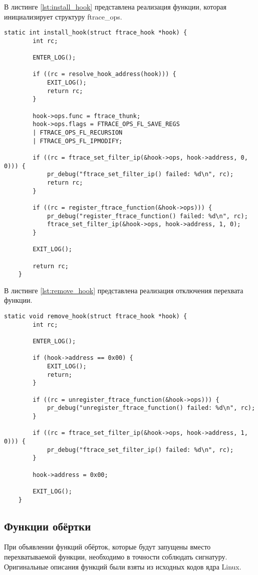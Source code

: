 В листинге \ref{lst:install_hook} представлена реализация функции, которая инициализирует структуру ftrace\_ops.

\begin{lstlisting}[label=lst:install_hook, caption=Реализация функции install\_hook()]
	static int install_hook(struct ftrace_hook *hook) {
		int rc;
		
		ENTER_LOG();
		
		if ((rc = resolve_hook_address(hook))) {
			EXIT_LOG();
			return rc;
		}
		
		hook->ops.func = ftrace_thunk; 
		hook->ops.flags = FTRACE_OPS_FL_SAVE_REGS
		| FTRACE_OPS_FL_RECURSION
		| FTRACE_OPS_FL_IPMODIFY;
		
		if ((rc = ftrace_set_filter_ip(&hook->ops, hook->address, 0, 0))) {
			pr_debug("ftrace_set_filter_ip() failed: %d\n", rc);
			return rc;
		}
		
		if ((rc = register_ftrace_function(&hook->ops))) {
			pr_debug("register_ftrace_function() failed: %d\n", rc);
			ftrace_set_filter_ip(&hook->ops, hook->address, 1, 0);
		}
		
		EXIT_LOG();
		
		return rc;
	}
\end{lstlisting}

В листинге \ref{lst:remove_hook} представлена реализация отключения перехвата функции.

\begin{lstlisting}[label=lst:remove_hook, caption=Реализация функции remove\_hook()]
	static void remove_hook(struct ftrace_hook *hook) {
		int rc;
		
		ENTER_LOG();
		
		if (hook->address == 0x00) {
			EXIT_LOG();
			return;
		}
		
		if ((rc = unregister_ftrace_function(&hook->ops))) {
			pr_debug("unregister_ftrace_function() failed: %d\n", rc);
		}
		
		if ((rc = ftrace_set_filter_ip(&hook->ops, hook->address, 1, 0))) {
			pr_debug("ftrace_set_filter_ip() failed: %d\n", rc);
		}
		
		hook->address = 0x00;
		
		EXIT_LOG();
	}
\end{lstlisting}

\subsection{Функции обёртки}

При объявлении функций обёрток, которые будут запущены вместо перехватываемой функции, необходимо в точности соблюдать сигнатуру. Оригинальные описания функций были взяты из исходных кодов ядра Linux. 

